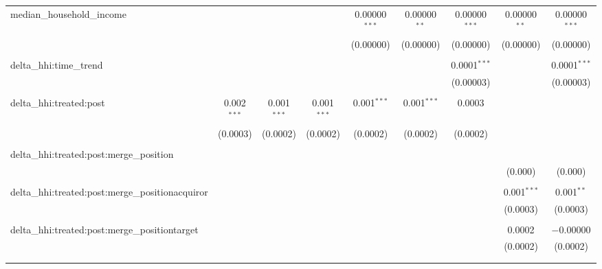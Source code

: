 \begin{table}[H]
{\begin{tabular}{@{\extracolsep{5pt}}lcccccccc}
  median\_household\_income &  &  &  & 0.00000$^{***}$ & 0.00000$^{**}$ & 0.00000$^{***}$ & 0.00000$^{**}$ & 0.00000$^{***}$ \\  

   &  &  &  & (0.00000) & (0.00000) & (0.00000) & (0.00000) & (0.00000) \\  

   & & & & & & & & \\  

  delta\_hhi:time\_trend &  &  &  &  &  & 0.0001$^{***}$ &  & 0.0001$^{***}$ \\  

   &  &  &  &  &  & (0.00003) &  & (0.00003) \\  

   & & & & & & & & \\  

  delta\_hhi:treated:post & 0.002$^{***}$ & 0.001$^{***}$ & 0.001$^{***}$ & 0.001$^{***}$ & 0.001$^{***}$ & 0.0003 &  &  \\  

   & (0.0003) & (0.0002) & (0.0002) & (0.0002) & (0.0002) & (0.0002) &  &  \\  

   & & & & & & & & \\  

  delta\_hhi:treated:post:merge\_position &  &  &  &  &  &  &  &  \\  

   &  &  &  &  &  &  & (0.000) & (0.000) \\  

   & & & & & & & & \\  

  delta\_hhi:treated:post:merge\_positionacquiror &  &  &  &  &  &  & 0.001$^{***}$ & 0.001$^{**}$ \\  

   &  &  &  &  &  &  & (0.0003) & (0.0003) \\  

   & & & & & & & & \\  

  delta\_hhi:treated:post:merge\_positiontarget &  &  &  &  &  &  & 0.0002 & $-$0.00000 \\  

   &  &  &  &  &  &  & (0.0002) & (0.0002) \\  

   & & & & & & & & \\  

 \hline \\[-1.8ex]  


\end{tabular}}
\end{table}
